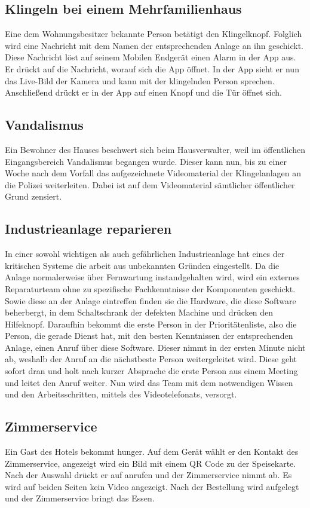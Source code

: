 \subsection{Klingeln bei einem Mehrfamilienhaus}\label{subsec:klingeln-bei-einem-mehrfamilienhaus}
    Eine dem Wohnungsbesitzer bekannte Person betätigt den Klingelknopf.
    Folglich wird eine Nachricht mit dem Namen der entsprechenden Anlage an ihn geschickt.
    Diese Nachricht löst auf seinem Mobilen Endgerät einen Alarm in der App aus.
    Er drückt auf die Nachricht, worauf sich die App öffnet.
    In der App sieht er nun das Live-Bild der Kamera und kann mit der klingelnden Person sprechen.
    Anschließend drückt er in der App auf einen Knopf und die Tür öffnet sich.

\subsection{Vandalismus}\label{subsec:vandalismus}
    Ein Bewohner des Hauses beschwert sich beim Hausverwalter, weil im öffentlichen Eingangsbereich Vandalismus begangen wurde.
    Dieser kann nun, bis zu einer Woche nach dem Vorfall das aufgezeichnete Videomaterial der Klingelanlagen an die Polizei weiterleiten.
    Dabei ist auf dem Videomaterial sämtlicher öffentlicher Grund zensiert.

\subsection{Industrieanlage reparieren}\label{subsec:industrieanlage-reparieren}
    In einer sowohl wichtigen als auch gefährlichen Industrieanlage hat eines der kritischen Systeme die arbeit aus unbekannten Gründen eingestellt.
    Da die Anlage normalerweise über Fernwartung instandgehalten wird, wird ein externes Reparaturteam ohne zu spezifische Fachkenntnisse der Komponenten geschickt.
    Sowie diese an der Anlage eintreffen finden sie die Hardware, die diese Software beherbergt, in dem Schaltschrank der defekten Machine und drücken den Hilfeknopf.
    Daraufhin bekommt die erste Person in der Prioritätenliste, also die Person, die gerade Dienst hat, mit den besten Kenntnissen der entsprechenden Anlage, einen Anruf über diese Software.
    Dieser nimmt in der ersten Minute nicht ab, weshalb der Anruf an die nächstbeste Person weitergeleitet wird.
    Diese geht sofort dran und holt nach kurzer Absprache die erste Person aus einem Meeting und leitet den Anruf weiter.
    Nun wird das Team mit dem notwendigen Wissen und den Arbeitsschritten, mittels des Videotelefonats, versorgt.

\subsection{Zimmerservice}\label{subsec:zimmerservice}
    Ein Gast des Hotels bekommt hunger.
    Auf dem Gerät wählt er den Kontakt des Zimmerservice, angezeigt wird ein Bild mit einem QR Code zu der Speisekarte.
    Nach der Auswahl drückt er auf anrufen und der Zimmerservice nimmt ab.
    Es wird auf beiden Seiten kein Video angezeigt.
    Nach der Bestellung wird aufgelegt und der Zimmerservice bringt das Essen.
